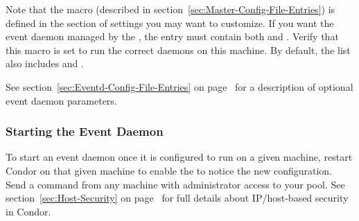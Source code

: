 Note that the  macro (described in
section~\ref{sec:Master-Config-File-Entries}) is defined in the
section of settings you may want to customize.
If you want the event daemon managed by the , the
 entry must contain both 
 and .
Verify that this macro is set to run the correct daemons on
this machine.  By default, the list also includes
 and .

See section~\ref{sec:Eventd-Config-File-Entries} on
page~\pageref{sec:Eventd-Config-File-Entries} for a description of
optional event daemon parameters.

\subsubsection{\label{sec:Start-EventD} 
Starting the Event Daemon} 

To start an event daemon once it is configured to run on a given
machine, restart Condor on that given machine to enable
the  to notice the new configuration.
Send a  command from any machine
with administrator access to your pool.
See section~\ref{sec:Host-Security} on
page~\pageref{sec:Host-Security} for full details about IP/host-based
security in Condor.

